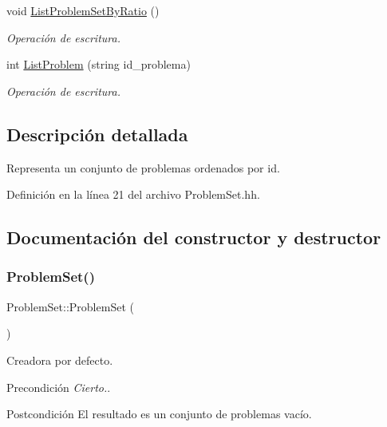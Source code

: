 \begin{DoxyCompactItemize}
void \mbox{\hyperlink{class_problem_set_ab45006ff08ba3c36bc3c08a427391b69}{List\+Problem\+Set\+By\+Ratio}} ()
\begin{DoxyCompactList}\small\item\em Operación de escritura. \end{DoxyCompactList}\item 
int \mbox{\hyperlink{class_problem_set_a7ef02642813914f7ca93c93835ddcda3}{List\+Problem}} (string id\+\_\+problema)
\begin{DoxyCompactList}\small\item\em Operación de escritura. \end{DoxyCompactList}\end{DoxyCompactItemize}


\subsection{Descripción detallada}
Representa un conjunto de problemas ordenados por id. 

Definición en la línea 21 del archivo Problem\+Set.\+hh.



\subsection{Documentación del constructor y destructor}
\mbox{\label{class_problem_set_a3eadb6c62386acf9948b95bb6d05b5ae}} 
\subsubsection{\texorpdfstring{Problem\+Set()}{ProblemSet()}}
{\footnotesize\ttfamily Problem\+Set\+::\+Problem\+Set (\begin{DoxyParamCaption}{ }\end{DoxyParamCaption})}



Creadora por defecto. 

\begin{DoxyPrecond}{Precondición}
{\itshape Cierto.}. 
\end{DoxyPrecond}
\begin{DoxyPostcond}{Postcondición}
El resultado es un conjunto de problemas vacío. 
\end{DoxyPostcond}


